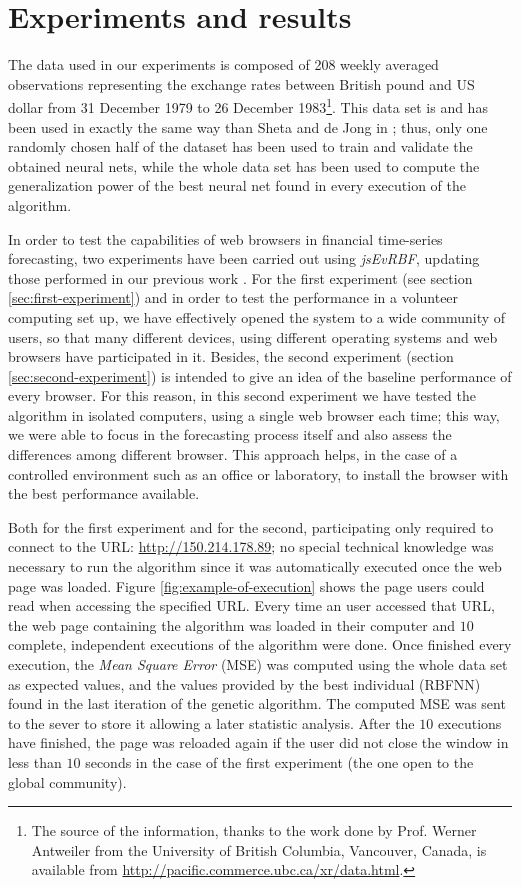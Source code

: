 \documentclass{article}
\begin{document}
\section{Experiments and results}
\label{sec:experiments}
The data used in our experiments is composed of 208
weekly averaged observations representing the exchange rates between
British pound and US dollar from 31 December 1979 to 26 December
1983\footnote{The source of the information, thanks to the work done
  by Prof. Werner Antweiler from the University of British Columbia,
  Vancouver, Canada, is available from
  \url{http://pacific.commerce.ubc.ca/xr/data.html}.}. This data set is and
has been used in exactly the same way than Sheta and de Jong in
\cite{Sheta2001}; thus, only one randomly chosen half of the
dataset has been used to train and validate the obtained neural nets,
while the whole data set has been used to compute the generalization
power of the best neural net found in every execution of the
algorithm.

In order to test the capabilities of web browsers in financial time-series forecasting,
two experiments have been carried out using {\em jsEvRBF},
updating those performed in our previous work
\cite{DBLP:conf/dcai/RivasPMAG16}.
For the first experiment (see section \ref{sec:first-experiment}) and in order to test the performance in a volunteer computing set up, we
have effectively opened the system to a wide community of users, so that many different
devices, using different operating systems and web browsers have
participated in it. Besides, the second experiment (section \ref{sec:second-experiment}) is intended to give an idea of the
baseline performance of every browser. For this reason, in this second experiment we have
tested the algorithm in isolated computers, using a single web
browser each time; this way, we were able to focus in the forecasting process itself and
also assess the differences among different browser. This approach helps, in the case of a controlled environment such as an office or
laboratory, to install the browser with the best performance
available.

Both for the first experiment and for the second, participating only required to connect
to the URL: \url{http://150.214.178.89}; no special technical knowledge was necessary to run the
algorithm since it was automatically executed once the web page was
loaded. Figure \ref{fig:example-of-execution} shows the page users
could read when accessing the specified URL.
Every time an user accessed that URL, the web page containing the algorithm was loaded in their computer and $10$ complete, independent executions of the algorithm were done. Once finished every execution, the {\em Mean Square Error} (MSE)  was computed using the whole data set as expected values, and the values provided by the best individual (RBFNN) found in the last iteration of the genetic algorithm. The computed MSE was sent to the sever to store it allowing a later statistic analysis. After the $10$ executions have finished, the page was reloaded again if the user did not close the window in less than $10$ seconds in the case of the first experiment (the one open to the global community).
\end{document}

